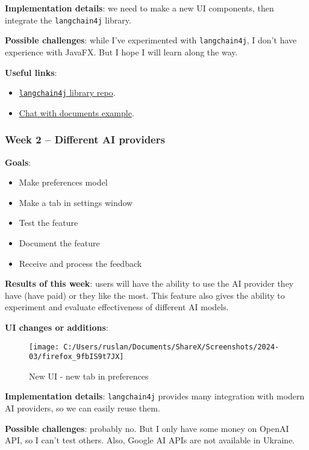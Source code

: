 \documentclass{article}
\begin{document}
	\textbf{Implementation details}: we need to make a new UI components, then integrate the \texttt{langchain4j} library.
	
	\textbf{Possible challenges}: while I've experimented with \texttt{langchain4j}, I don't have experience with JavaFX. But I hope I will learn along the way.
	
	\textbf{Useful links}:
	\begin{itemize}
		\item \href{https://github.com/langchain4j/langchain4j}{\texttt{langchain4j} library repo}.
		\item \href{https://github.com/langchain4j/langchain4j-examples/blob/main/other-examples/src/main/java/ChatWithDocumentsExamples.java}{Chat with documents example}.
	\end{itemize}

	\subsubsection{Week 2 -- Different AI providers}
	\textbf{Goals}:
	\begin{itemize}
		\item Make preferences model
		\item Make a tab in settings window
		\item Test the feature
		\item Document the feature
		\item Receive and process the feedback
	\end{itemize}
	
	\textbf{Results of this week}: users will have the ability to use the AI provider they have (have paid) or they like the most. This feature also gives the ability to experiment and evaluate effectiveness of different AI models.
	
	\textbf{UI changes or additions}:
	
	\begin{figure}[H]
		\centering
		\texttt{[image: C:/Users/ruslan/Documents/ShareX/Screenshots/2024-03/firefox\_9fbIS9t7JX]}
		\caption{New UI - new tab in preferences}
		\label{fig:firefox9fbis9t7jx}
	\end{figure}
	
	\textbf{Implementation details}: \texttt{langchain4j} provides many integration with modern AI providers, so we can easily reuse them.
	
	\textbf{Possible challenges}: probably no. But I only have some money on OpenAI API, so I can't test others. Also, Google AI APIs are not available in Ukraine.
	
\end{document}
